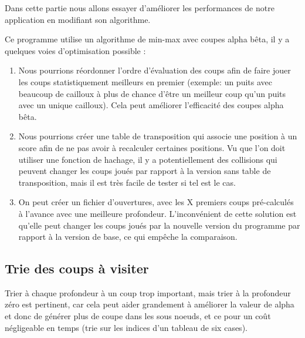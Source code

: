 \documentclass[
 aip,
 jmp,
 amsmath,amssymb,
 reprint
]{revtex4-1}
\begin{document}
Dans cette partie nous allons essayer d'améliorer les performances de notre application en modifiant son algorithme.\par
Ce programme utilise un algorithme de min-max avec coupes alpha bêta\pageref{Fig:alpha_beta}, il y a quelques voies d'optimisation possible :
\begin{enumerate}
\item Nous pourrions réordonner l'ordre d'évaluation des coups afin de faire jouer les coups statistiquement meilleurs en premier (exemple: un puits avec beaucoup de cailloux à plus de chance d'être un meilleur coup qu'un puits avec un unique cailloux). Cela peut améliorer l'efficacité des coupes alpha bêta\pageref{Fig:alpha_beta}.
\item Nous pourrions créer une table de transposition qui associe une position à un score afin de ne pas avoir à recalculer certaines positions. Vu que l'on doit utiliser une fonction de hachage, il y a potentiellement des collisions qui peuvent changer les coups joués par rapport à la version sans table de transposition, mais il est très facile de tester si tel est le cas.
\item On peut créer un fichier d'ouvertures, avec les X premiers coups pré-calculés à l'avance avec une meilleure profondeur. L'inconvénient de cette solution est qu'elle peut changer les coups joués par la nouvelle version du programme par rapport à la version de base, ce qui empêche la comparaison.
\end{enumerate}

\subsection{Trie des coups à visiter}
Trier à chaque profondeur à un coup trop important, mais trier à la profondeur zéro est pertinent, car cela peut aider grandement à améliorer la valeur de alpha\pageref{Fig:alpha_beta} et donc de générer plus de coupe dans les sous noeuds, et ce pour un coût négligeable en temps (trie sur les indices d'un tableau de six cases).
\end{document}
